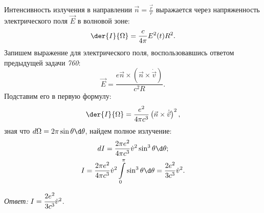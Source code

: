 Интенсивность излучения в направлении \( \vec{n} = \frac{\vec{r}}{r} \)
выражается через напряженность электрического поля \( \vec{E} \) в волновой
зоне:
\[
    \der{I}{\Omega} = \frac{c}{4\pi} E^2(t)R^2.
\]
Запишем выражение для электрического поля, воспользовавшись ответом предыдущей
задачи \emph{760}:
\[
    \vec{E} = \frac{e\vec{n}\times\left(\vec{n}\times\dot{\vec{v}}\right)}
    {c^2R}.
\]
Подставим его в первую формулу: 
\[
    \der{I}{\Omega} = \frac{e^2}{4\pi c^3} \left( \vec{n}\times \dot{\vec{v}}
    \right)^2,
\]
зная что \( d\Omega = 2\pi\sin\theta\d\theta \), найдем полное излучение:
\begin{gather*}
    dI = \frac{2\pi e^2}{4\pi c^3} \dot{v}^2 \sin^3\theta\d\theta; \\
    I = \frac{2\pi e^2}{4\pi c^3}\dot{v}^2\int\limits_0^\pi\sin^3\theta\d\theta
    = \frac{2e^2}{3c^3}\dot{v}^2.
\end{gather*}

\vspace*{2em}
\emph{Ответ:} \( I = \cfrac{2e^2}{3c^3}\dot{v}^2 \).

